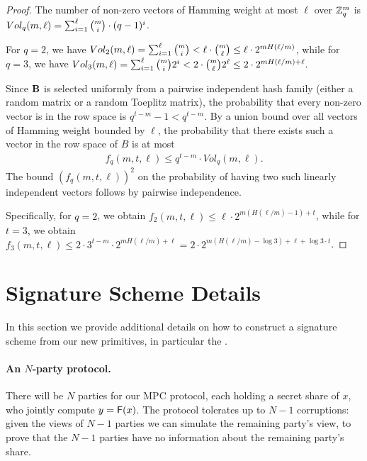 \begin{proof}The number of non-zero vectors of Hamming weight at most $\ell$ over $\mathbb{Z}_q^m$ is
$Vol_q(m,\ell) = \sum_{i=1}^\ell \tbinom{m}{i} \cdot (q-1)^{i}$.

For $q = 2$, we have
$Vol_2(m,\ell) = \sum_{i=1}^\ell \tbinom{m}{i} <
\ell \cdot \tbinom{m}{\ell} \leq
\ell \cdot 2^{m H(\ell/m)}$, while for $q = 3$, we have
$Vol_3(m,\ell) = \sum_{i=1}^\ell \tbinom{m}{i} 2^i <
2 \cdot \tbinom{m}{\ell} 2^\ell \leq
2 \cdot 2^{m H(\ell/m) + \ell}.$

Since $\mat{B}$ is selected uniformly from a pairwise independent hash family (either a random matrix or a random Toeplitz matrix),
the probability that every non-zero vector is in the row space is $q^{t-m} - 1 < q^{t-m}$. By a union bound over all vectors of Hamming weight bounded by $\ell$, the probability that there exists such a vector in the row space of $B$ is at most
\begin{align*}
f_q(m,t,\ell) \leq q^{t-m} \cdot Vol_q(m,\ell).
\end{align*}
The bound $(f_q(m,t,\ell))^2$ on the probability of having two such linearly independent vectors follows by pairwise independence.

Specifically, for $q = 2$, we obtain
$f_2(m,t,\ell) \leq \ell \cdot 2^{m (H(\ell/m) - 1) + t}$,
while for $t = 3$, we obtain
$f_3(m,t,\ell) \leq 2 \cdot 3^{t-m} \cdot 2^{m H(\ell/m) + \ell} = 2 \cdot 2^{m (H(\ell/m) - \log 3) + \ell + \log 3 \cdot t}$.
\end{proof}











\section{Signature Scheme Details}
\label{appendix:picnic}
In this section we provide additional details on how to construct a signature scheme from our
new primitives, in particular the \ttOWF.


\paragraph{An $N$-party protocol.}
There will be $N$ parties for our MPC protocol, each holding a secret share of
$x$, who jointly compute $y = \mathsf{F}(x)$.  The protocol tolerates up to  $N-1$ 
corruptions: given the views of $N-1$ parties we can simulate the remaining
party's view, to prove that the $N-1$ parties have no information about the
remaining party's share. 

